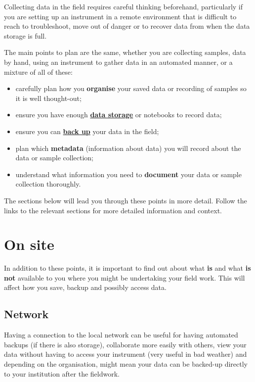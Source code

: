 \documentclass[12pt,a4paper,oneside]{report}
\providecommand{\tightlist}{%
  \setlength{\itemsep}{0pt}\setlength{\parskip}{0pt}}
\begin{document}
Collecting data in the field requires careful thinking beforehand,
particularly if you are setting up an instrument in a remote environment
that is difficult to reach to troubleshoot, move out of danger or to
recover data from when the data storage is full.

The main points to plan are the same, whether you are collecting
samples, data by hand, using an instrument to gather data in an
automated manner, or a mixture of all of these:

\begin{itemize}
\tightlist
\item
  carefully plan how you \textbf{organise} your saved data or recording
  of samples so it is well thought-out;
\item
  ensure you have enough \textbf{\protect\hyperlink{storing-data}{data
  storage}} or notebooks to record data;
\item
  ensure you can \textbf{\protect\hyperlink{backing-up-data}{back up}}
  your data in the field;
\item
  plan which \textbf{metadata} (information about data) you will record
  about the data or sample collection;
\item
  understand what information you need to \textbf{document} your data or
  sample collection thoroughly.
\end{itemize}

The sections below will lead you through these points in more detail.
Follow the links to the relevant sections for more detailed information
and context.

\hypertarget{on-site}{%
\section{On site}\label{on-site}}

In addition to these points, it is important to find out about what
\textbf{is} and what \textbf{is not} available to you where you might be
undertaking your field work. This will affect how you save, backup and
possibly access data.

\hypertarget{network}{%
\subsection{Network}\label{network}}

Having a connection to the local network can be useful for having
automated backups (if there is also storage), collaborate more easily
with others, view your data without having to access your instrument
(very useful in bad weather) and depending on the organisation, might
mean your data can be backed-up directly to your institution after the
fieldwork.
\end{document}
